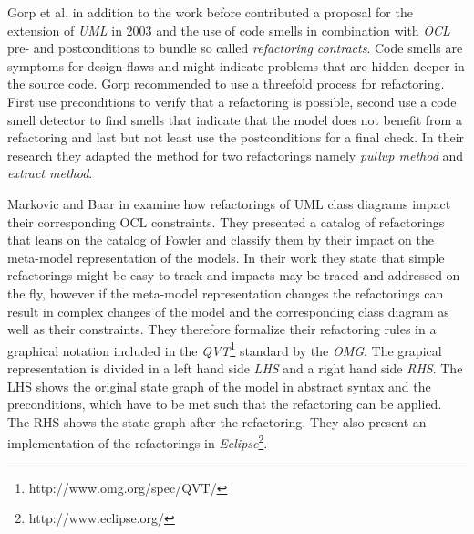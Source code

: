 \documentclass{llncs}
\begin{document}
Gorp et al. \cite{gorp03} in addition to the work before contributed a proposal for the extension of \textit{UML} in
2003 and the use of code smells in combination with \textit{OCL} pre- and postconditions to bundle so called
\textit{refactoring contracts}. Code smells are symptoms for design flaws and might indicate problems that are hidden
deeper in the source code. Gorp recommended to use a threefold process for refactoring. First use preconditions to
verify that a refactoring is possible, second use a code smell detector to find smells that indicate that the model does
not benefit from a refactoring and last but not least use the postconditions for a final check. In their research they
adapted the method for two refactorings namely \textit{pullup method} and \textit{extract method}.

Markovic and Baar in \cite{DBLP:journals/sosym/MarkovicB08} examine how refactorings of UML class diagrams impact their
corresponding OCL constraints. They presented a catalog of refactorings that leans on the catalog of Fowler and classify
them by their impact on the meta-model representation of the models. In their work they state that simple refactorings
might be easy to track and impacts may be traced and addressed on the fly, however if the meta-model representation
changes the refactorings can result in complex changes of the model and the corresponding class diagram as well as their
constraints. They therefore formalize their refactoring rules in a graphical notation included in the
\textit{QVT}\footnote{http://www.omg.org/spec/QVT/} standard by the \textit{OMG}. The grapical representation is divided
in a left hand side \textit{LHS} and a right hand side \textit{RHS}. The LHS shows the original state graph of the model
in abstract syntax and the preconditions, which have to be met such that the refactoring can be applied. The RHS shows
the state graph after the refactoring. They also present an implementation of the refactorings in
\textit{Eclipse}\footnote{http://www.eclipse.org/}.
\end{document}
